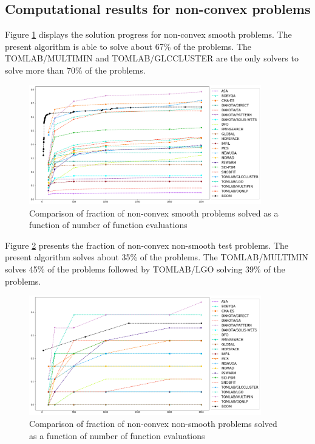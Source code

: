 \subsection{Computational results for non-convex problems}
Figure \ref{fig:NonConvexSmooth} displays the solution progress for non-convex smooth problems. The present algorithm is able to solve about 67\% of the problems. The TOMLAB/MULTIMIN and TOMLAB/GLCCLUSTER are the only solvers to solve more than 70\% of the problems.

\begin{figure}[h]
\includegraphics[width=0.9\textwidth]{img/ncvx_sm.png}
\caption{Comparison of fraction of non-convex smooth problems solved as a function of number of function evaluations}
\label{fig:NonConvexSmooth}
\end{figure}

\noindent
Figure \ref{fig:NonConvexNonSmooth} presents the fraction of non-convex non-smooth test problems. The present algorithm solves about 35\% of the problems. The TOMLAB/MULTIMIN solves 45\% of the problems followed by  TOMLAB/LGO solving 39\% of the problems.

\begin{figure}
\includegraphics[width=0.9\textwidth]{img/ncvx_nsm.png}
\caption{Comparison of fraction of non-convex non-smooth problems solved as a function of number of function evaluations}
\label{fig:NonConvexNonSmooth}
\end{figure}

